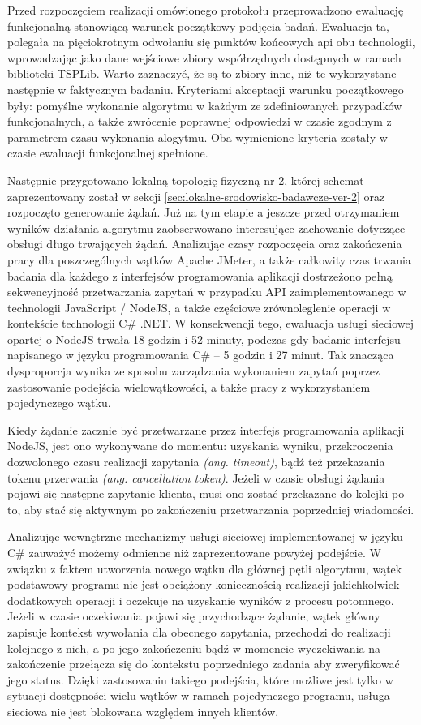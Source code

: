 Przed rozpoczęciem realizacji omówionego protokołu przeprowadzono ewaluację funkcjonalną stanowiącą warunek początkowy podjęcia badań. Ewaluacja ta, polegała na pięciokrotnym odwołaniu się punktów końcowych api obu technologii, wprowadzając jako dane wejściowe zbiory współrzędnych dostępnych w ramach biblioteki TSPLib. Warto zaznaczyć, że są to zbiory inne, niż te wykorzystane następnie w faktycznym badaniu. Kryteriami akceptacji warunku początkowego były: pomyślne wykonanie algorytmu w każdym ze zdefiniowanych przypadków funkcjonalnych, a także zwrócenie poprawnej odpowiedzi w czasie zgodnym z parametrem czasu wykonania alogytmu. Oba wymienione kryteria zostały w czasie ewaluacji funkcjonalnej spełnione.

Następnie przygotowano lokalną topologię fizyczną nr 2, której schemat zaprezentowany został w sekcji \ref{sec:lokalne-srodowisko-badawcze-ver-2} oraz rozpoczęto generowanie żądań. Już na tym etapie a jeszcze przed otrzymaniem wyników działania algorytmu zaobserwowano interesujące zachowanie dotyczące obsługi długo trwających żądań. Analizując czasy rozpoczęcia oraz zakończenia pracy dla poszczególnych wątków Apache JMeter, a także całkowity czas trwania badania dla każdego z interfejsów programowania aplikacji dostrzeżono pełną sekwencyjność przetwarzania zapytań w przypadku API zaimplementowanego w technologii JavaScript / NodeJS, a także częściowe zrównoleglenie operacji w kontekście technologii C\# .NET. W konsekwencji tego, ewaluacja usługi sieciowej opartej o NodeJS trwała 18 godzin i 52 minuty, podczas gdy badanie interfejsu napisanego w języku programowania C\# -- 5 godzin i 27 minut. Tak znacząca dysproporcja wynika ze sposobu zarządzania wykonaniem zapytań poprzez zastosowanie podejścia wielowątkowości, a także pracy z wykorzystaniem pojedynczego wątku.

Kiedy żądanie zacznie być przetwarzane przez interfejs programowania aplikacji NodeJS, jest ono wykonywane do momentu: uzyskania wyniku, przekroczenia dozwolonego czasu realizacji zapytania \textit{(ang. timeout)}, bądź też przekazania tokenu przerwania \textit{(ang. cancellation token)}. Jeżeli w czasie obsługi żądania pojawi się następne zapytanie klienta, musi ono zostać przekazane do kolejki po to, aby stać się aktywnym po zakończeniu przetwarzania poprzedniej wiadomości.

Analizując wewnętrzne mechanizmy usługi sieciowej implementowanej w języku C\# zauważyć możemy odmienne niż zaprezentowane powyżej podejście. W związku z faktem utworzenia nowego wątku dla głównej pętli algorytmu, wątek podstawowy programu nie jest obciążony koniecznością realizacji jakichkolwiek dodatkowych operacji i oczekuje na uzyskanie wyników z procesu potomnego. Jeżeli w czasie oczekiwania pojawi się przychodzące żądanie, wątek główny zapisuje kontekst wywołania dla obecnego zapytania, przechodzi do realizacji kolejnego z nich, a po jego zakończeniu bądź w momencie wyczekiwania na zakończenie przełącza się do kontekstu poprzedniego zadania aby zweryfikować jego status. Dzięki zastosowaniu takiego podejścia, które możliwe jest tylko w sytuacji dostępności wielu wątków w ramach pojedynczego programu, usługa sieciowa nie jest blokowana względem innych klientów.

